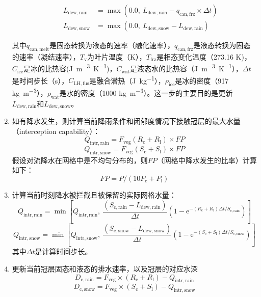 \begin{enumerate}
\begin{enumerate}
\begin{equation}
\begin{aligned}
            L_{\mathrm{dew,rain}} &=\max \left(0.0,\ L_{\mathrm{dew,rain}}-q_{\mathrm{can, frz}} \times \Delta t\right) \\
            L_{\mathrm{dew,snow}} &=\max \left(0.0,\ L_{\mathrm{dew,snow}}-L_{\mathrm{dew,rain}}\right)
          \end{aligned}
        \end{equation}
    \end {enumerate}
  其中$q_{\mathrm{can, melt}}$是固态转换为液态的速率（融化速率），$q_{\mathrm{can, frz}}$是液态转换为固态的速率（凝结速率），$T_{\mathrm{v}}$为叶片温度（K），$T_{\mathrm{frz}}$是相态变化温度（273.16 K)，$C_{\mathrm{ice}}$是冰的比热容(\unit{J.m^{-3}.K^{-1}})，$C_{\mathrm{wat}}$是液态水的比热容（\unit{J.m^{-3}.K^{-1}}），$\Delta t$是时间步长（s），$C_{\mathrm{LH, fus}}$是融合潜热（\unit{J.kg^{-1}}），$\rho_{\mathrm{ice}}$是冰的密度（917 \unit{kg.m^{-3}}），$\rho_{\mathrm{wat}}$是水的密度（1000 \unit{kg.m^{-3}}）。这一步的主要目的是更新$L_{\mathrm{dew,rain}}$和$L_{\mathrm{dew,snow}}$。

\item 如有降水发生，则计算当前降雨条件和闭郁度情况下接触冠层的最大水量（interception capability）：
  \begin{equation}
    Q_{\mathrm{intr,rain}} =F_{\mathrm{veg}}\left(R_{\mathrm{c}}+R_{\mathrm{l}}\right)\times FP
  \end{equation}
  \begin{equation}
    Q_{\mathrm{intr,snow}} =F_{\mathrm{veg}}\left(S_{\mathrm{c}}+S_{\mathrm{l}}\right)\times FP
  \end{equation}
  假设对流降水在网格中是不均匀分布的，则$FP$（网格中降水发生的比率）计算如下：
  \begin{equation}
    FP = P/ (10P_{\mathrm{c}} + P_{\mathrm{l}})
  \end{equation}
\item 计算当前时刻降水被拦截且被保留的实际网格水量：
  \begin{equation}
    Q_{\mathrm{intr,rain}} = \min\left[Q_{\mathrm{intr,rain}}, \ \frac{(S_{\mathrm{c,rain}} - L_{\mathrm{dew,rain}})}{\Delta{t}}  (1-{\mathrm e}^{-\left(R_{\mathrm{c}}+R_{\mathrm{l}}\right)\Delta{t}/S_{\mathrm{c,rain}}})\right]
  \end{equation}
  \begin{equation}
    Q_{\mathrm{intr,snow}} = \min\left[Q_{\mathrm{intr,snow}},\ \frac{(S_{\mathrm{c,snow}} - L_{\mathrm{dew,snow}})}{\Delta{t}} (1-{\mathrm e}^{-\left(S_{\mathrm{c}}+S_{\mathrm{l}}\right)\Delta{t}/S_{\mathrm{c,snow}}})\right]
  \end{equation}
  其中${\Delta{t}}$是计算时间步长。
\item 更新当前冠层固态和液态的排水速率，以及冠层的对应水深
  \begin{equation}
    D_{\mathrm{c,rain}}=F_{\mathrm{veg}} \times (R_{\mathrm{c}}+R_{\mathrm{l}})-Q_{\mathrm{intr,rain}}
  \end{equation}
  \begin{equation}
    D_{\mathrm{c,snow}}=F_{\mathrm{veg}} \times (S_{\mathrm{c}}+S_{\mathrm{l}})-Q_{\mathrm{intr,snow}}
  \end{equation}
\end{enumerate}
